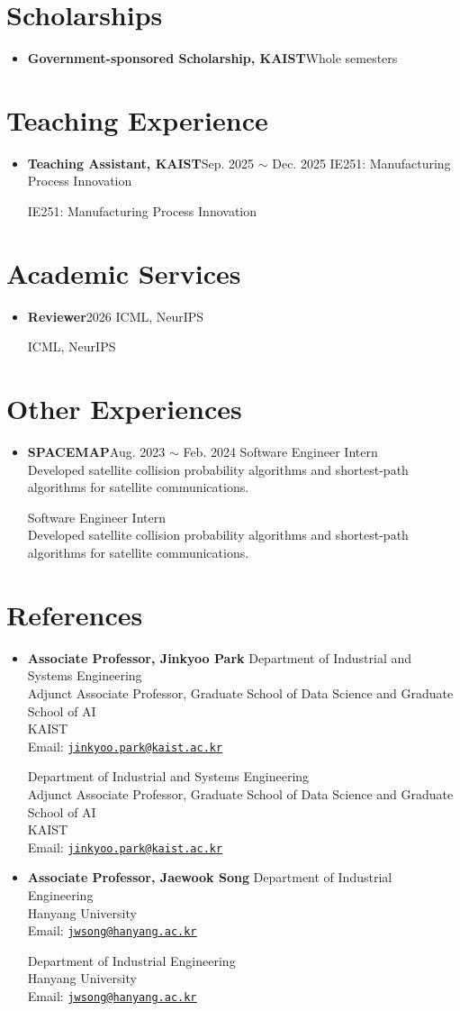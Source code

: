 \documentclass[11pt,a4paper]{moderncv}
\newcommand*{\entrybullet}{{\tiny\faCircle[regular]}}
\newlength{\entryindent}
\newenvironment{cvlist}%
  {\vspace{-3.4pt}%
   \begin{itemize}[label=\hspace{-0.5pt}\entrybullet, leftmargin=\entryindent,
                   labelsep=0pt, labelwidth=\entryindent, align=left,
                   topsep=0pt, partopsep=0pt, parsep=0pt, itemsep=5.9pt]\small}%
  {\end{itemize}\vspace{-2.5pt}}
\newcommand{\cvevent}[3]{%
  \item \textbf{#1}\hfill #2%
  \ifx\relax#3\relax\else\par #3\fi}
\newcommand{\ul}[1]{\underline{#1}\rule[-5.4pt]{0pt}{0pt}}
\begin{document}
\section{Scholarships}
\begin{cvlist}
\cvevent{Government-sponsored Scholarship, KAIST}{Whole semesters}{}
\end{cvlist}

\section{Teaching Experience}
\begin{cvlist}
\cvevent{Teaching Assistant, KAIST}{Sep. 2025 $\sim$ Dec. 2025}{%
  IE251: Manufacturing Process Innovation}
\end{cvlist}

\section{Academic Services}
\begin{cvlist}
\cvevent{Reviewer}{2026}{%
  ICML, NeurIPS}
\end{cvlist}

\section{Other Experiences}
\begin{cvlist}
\cvevent{SPACEMAP}{Aug. 2023 $\sim$ Feb. 2024}{%
  Software Engineer Intern\\
  Developed satellite collision probability algorithms and shortest-path algorithms for satellite communications.}
\end{cvlist}

\section{References}
\begin{cvlist}
\cvevent{Associate Professor, Jinkyoo Park}{}{%
  Department of Industrial and Systems Engineering\\
  Adjunct Associate Professor, Graduate School of Data Science and Graduate School of AI\\
  KAIST\\
  Email: \ul{\href{mailto:jinkyoo.park@kaist.ac.kr}{\texttt{jinkyoo.park@kaist.ac.kr}}}}

\cvevent{Associate Professor, Jaewook Song}{}{%
  Department of Industrial Engineering\\
  Hanyang University\\
  Email: \ul{\href{mailto:jwsong@hanyang.ac.kr}{\texttt{jwsong@hanyang.ac.kr}}}}
\end{cvlist}
\end{document}
